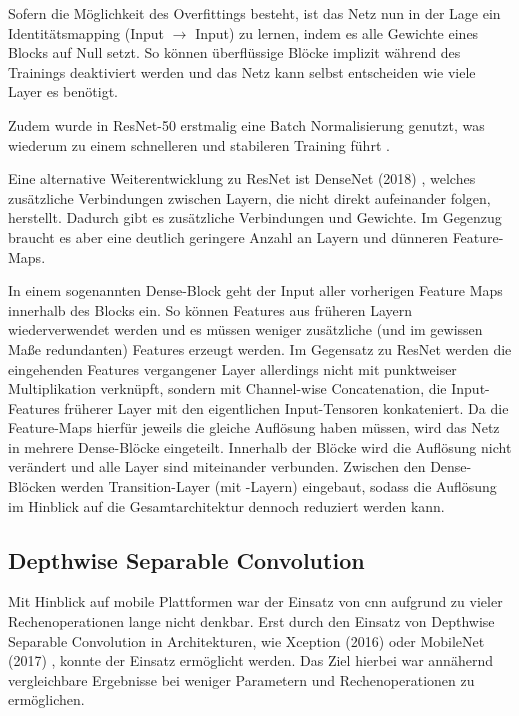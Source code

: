 Sofern die Möglichkeit des Overfittings besteht, ist das Netz nun in der Lage ein Identitätsmapping (Input $\to$ Input) zu lernen, indem es alle Gewichte eines Blocks auf Null setzt.
So können überflüssige Blöcke implizit während des Trainings deaktiviert werden und das Netz kann selbst entscheiden wie viele Layer es benötigt.

Zudem wurde in ResNet-50 erstmalig eine Batch Normalisierung \cite{Ioffe15} genutzt, was wiederum zu einem schnelleren und stabileren Training führt \cite{Gugger20}.


Eine alternative Weiterentwicklung zu ResNet ist DenseNet (2018) \cite{Huang18}, welches zusätzliche Verbindungen zwischen Layern, die nicht direkt aufeinander folgen, herstellt.
Dadurch gibt es zusätzliche Verbindungen und Gewichte.
Im Gegenzug braucht es aber eine deutlich geringere Anzahl an Layern und dünneren Feature-Maps.

In einem sogenannten Dense-Block geht der Input aller vorherigen Feature Maps innerhalb des Blocks ein.
So können Features aus früheren Layern wiederverwendet werden und es müssen weniger zusätzliche (und im gewissen Maße redundanten) Features erzeugt werden.
Im Gegensatz zu ResNet werden die eingehenden Features vergangener Layer allerdings nicht mit punktweiser Multiplikation verknüpft, sondern mit Channel-wise Concatenation, \dh die Input-Features früherer Layer mit den eigentlichen Input-Tensoren konkateniert.
Da die Feature-Maps hierfür jeweils die gleiche Auflösung haben müssen, wird das Netz in mehrere Dense-Blöcke eingeteilt.
Innerhalb der Blöcke wird die Auflösung nicht verändert und alle Layer sind miteinander verbunden.
Zwischen den Dense-Blöcken werden Transition-Layer (\ua mit \pool-Layern) eingebaut, sodass die Auflösung im Hinblick auf die Gesamtarchitektur dennoch reduziert werden kann.

\subsection{Depthwise Separable Convolution}
\label{subsubsec:group-conv}

Mit Hinblick auf mobile Plattformen war der Einsatz von \gls{cnn} aufgrund zu vieler Rechenoperationen lange nicht denkbar.
Erst durch den Einsatz von Depthwise Separable Convolution in Architekturen, wie Xception (2016) \cite{Chollet17} oder MobileNet (2017) \cite{Howard17}, konnte der Einsatz ermöglicht werden.
Das Ziel hierbei war annähernd vergleichbare Ergebnisse bei weniger Parametern und Rechenoperationen zu ermöglichen.

